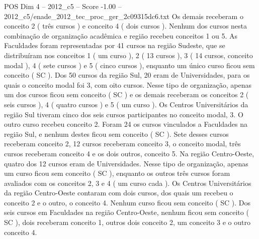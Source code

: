 \begin{textsample}{POS Dim 4 – 2012\_c5 – Score -1.00 – 2012\_c5/enade\_2012\_tec\_proc\_ger\_2c09315dc6.txt}
Os demais receberam o conceito 2 ( três cursos ) e conceito 4 ( dois cursos ).
Nenhum dos cursos nesta combinação de organização acadêmica e região recebeu conceitos 1 ou 5.
As Faculdades foram representadas por 41 cursos na região Sudeste, que se distribuíram nos conceitos 1 ( um curso ), 2 ( 13 cursos ), 3 ( 14 cursos, conceito modal ), 4 ( sete cursos ) e 5 ( cinco cursos ), enquanto um único curso ficou sem conceito ( SC ).
Dos 50 cursos da região Sul, 20 eram de Universidades, para os quais o conceito modal foi 3, com oito cursos.
Nesse tipo de organização, apenas um dos cursos ficou sem conceito ( SC ) e os demais receberam os conceitos 2 ( seis cursos ), 4 ( quatro cursos ) e 5 ( um curso ).
Os Centros Universitários da região Sul tiveram cinco dos seis cursos participantes no conceito modal, 3.
O outro curso recebeu conceito 2.
Foram 24 os cursos vinculados a Faculdades na região Sul, e nenhum destes ficou sem conceito ( SC ).
Sete desses cursos receberam conceito 2, 12 cursos receberam conceito 3, o conceito modal, três cursos receberam conceito 4 e os dois outros, conceito 5.
Na região Centro-Oeste, quatro dos 12 cursos eram de Universidades.
Nesse tipo de organização, apenas um curso ficou sem conceito ( SC ), enquanto os outros três cursos foram avaliados com os conceitos 2, 3 e 4 ( um curso cada ).
Os Centros Universitários da região Centro-Oeste contaram com dois cursos, dos quais um recebeu o conceito 2 e o outro, o conceito 4.
Nenhum curso ficou sem conceito ( SC ).
Dos seis cursos em Faculdades na região Centro-Oeste, nenhum ficou sem conceito ( SC ), dois receberam conceito 1, outros dois conceito 2, um conceito 3 e o outro conceito 4.

\end{textsample}

